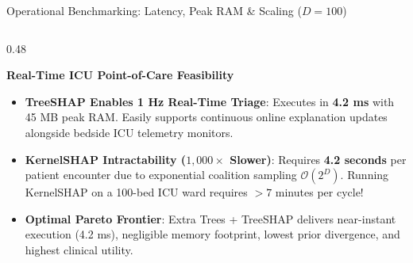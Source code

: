 \documentclass[aspectratio=169,10pt]{beamer}
\begin{document}
\begin{frame}{Operational Benchmarking: Latency, Peak RAM \& Scaling ($D=100$)}
\begin{columns}[t]
\begin{column}{0.48\textwidth}
\begin{exampleblock}{\textbf{Real-Time ICU Point-of-Care Feasibility}}
        \scriptsize
        \begin{itemize}\setlength\itemsep{3pt}
          \item \textbf{TreeSHAP Enables 1 Hz Real-Time Triage}:
          Executes in \textbf{4.2 ms} with 45 MB peak RAM. Easily supports continuous online explanation updates alongside bedside ICU telemetry monitors.
          \item \textbf{KernelSHAP Intractability ($1,000\times$ Slower)}:
          Requires \textbf{4.2 seconds} per patient encounter due to exponential coalition sampling $\mathcal{O}(2^D)$. Running KernelSHAP on a 100-bed ICU ward requires $>7$ minutes per cycle!
          \item \textbf{Optimal Pareto Frontier}:
          Extra Trees + TreeSHAP delivers near-instant execution (4.2 ms), negligible memory footprint, lowest prior divergence, and highest clinical utility.
        \end{itemize}
      \end{exampleblock}
    \end{column}
  \end{columns}
\end{frame}
\end{document}
